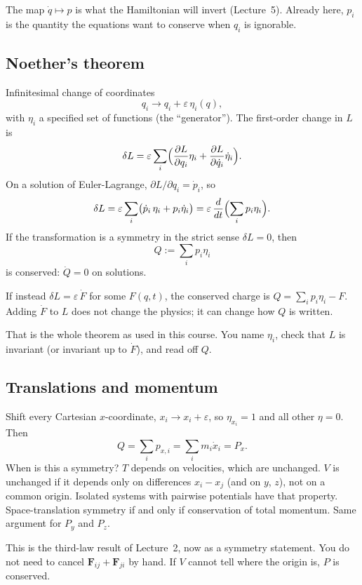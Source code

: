 \documentclass[11pt]{article}
\numberwithin{equation}{section}
\newcommand{\qdot}{\dot{q}}
\newcommand{\ddt}{\frac{d}{dt}}
\newcommand{\pd}[2]{\frac{\partial #1}{\partial #2}}
\newcommand{\vect}[1]{\mathbf{#1}}
\begin{document}
The map $\qdot\mapsto p$ is what the Hamiltonian will invert (Lecture~5). Already here, $p_i$ is the quantity the equations want to conserve when $q_i$ is ignorable.

\subsection{Noether's theorem}

Infinitesimal change of coordinates
\[
q_i \to q_i + \varepsilon\,\eta_i(q),
\]
with $\eta_i$ a specified set of functions (the ``generator''). The first-order change in $L$ is
\[
\delta L
= \varepsilon\sum_i\Bigl(
\pd{L}{q_i}\eta_i + \pd{L}{\qdot_i}\dot\eta_i\Bigr).
\]
On a solution of Euler-Lagrange, $\partial L/\partial q_i=\dot p_i$, so
\[
\delta L
= \varepsilon\sum_i\bigl(\dot p_i\,\eta_i + p_i\dot\eta_i\bigr)
= \varepsilon\,\ddt\Bigl(\sum_i p_i\eta_i\Bigr).
\]
If the transformation is a symmetry in the strict sense $\delta L=0$, then
\begin{equation}
\label{eq:Noether}
Q := \sum_i p_i\eta_i
\end{equation}
is conserved: $\dot Q=0$ on solutions.

If instead $\delta L=\varepsilon\,\dot F$ for some $F(q,t)$, the conserved charge is $Q=\sum_i p_i\eta_i - F$. Adding $\dot F$ to $L$ does not change the physics; it can change how $Q$ is written.

That is the whole theorem as used in this course. You name $\eta_i$, check that $L$ is invariant (or invariant up to $\dot F$), and read off $Q$.

\subsection{Translations and momentum}

Shift every Cartesian $x$-coordinate, $x_i\to x_i+\varepsilon$, so $\eta_{x_i}=1$ and all other $\eta=0$. Then
\[
Q = \sum_i p_{x,i} = \sum_i m_i\dot x_i = P_x.
\]
When is this a symmetry? $T$ depends on velocities, which are unchanged. $V$ is unchanged if it depends only on differences $x_i-x_j$ (and on $y$, $z$), not on a common origin. Isolated systems with pairwise potentials have that property. Space-translation symmetry if and only if conservation of total momentum. Same argument for $P_y$ and $P_z$.

This is the third-law result of Lecture~2, now as a symmetry statement. You do not need to cancel $\vect{F}_{ij}+\vect{F}_{ji}$ by hand. If $V$ cannot tell where the origin is, $P$ is conserved.
\end{document}
